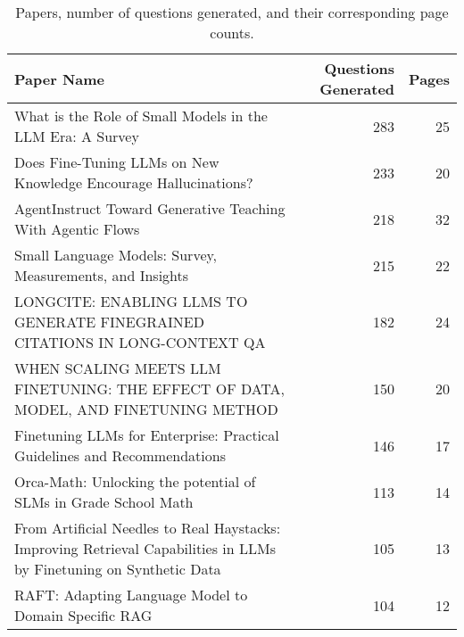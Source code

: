 \begin{table}[h]
   \centering
   \caption{Papers, number of questions generated, and their corresponding page counts.}
   \label{tab:questions_and_pages}
   \begin{tabular}{p{8cm} r r}
   \toprule
   \textbf{Paper Name} & \textbf{Questions Generated} & \textbf{Pages} \\
   \midrule
   What is the Role of Small Models in the LLM Era: A Survey & 283 & 25 \\
   Does Fine-Tuning LLMs on New Knowledge Encourage Hallucinations? & 233 & 20 \\
   AgentInstruct Toward Generative Teaching With Agentic Flows & 218 & 32 \\
   Small Language Models: Survey, Measurements, and Insights & 215 & 22 \\
   LONGCITE: ENABLING LLMS TO GENERATE FINEGRAINED CITATIONS IN LONG-CONTEXT QA & 182 & 24 \\
   WHEN SCALING MEETS LLM FINETUNING: THE EFFECT OF DATA, MODEL, AND FINETUNING METHOD & 150 & 20 \\
   Finetuning LLMs for Enterprise: Practical Guidelines and Recommendations & 146 & 17 \\
   Orca-Math: Unlocking the potential of SLMs in Grade School Math & 113 & 14 \\
   From Artificial Needles to Real Haystacks: Improving Retrieval Capabilities in LLMs by Finetuning on Synthetic Data & 105 & 13 \\
   RAFT: Adapting Language Model to Domain Specific RAG & 104 & 12 \\
   \bottomrule
   \end{tabular}
\end{table}

